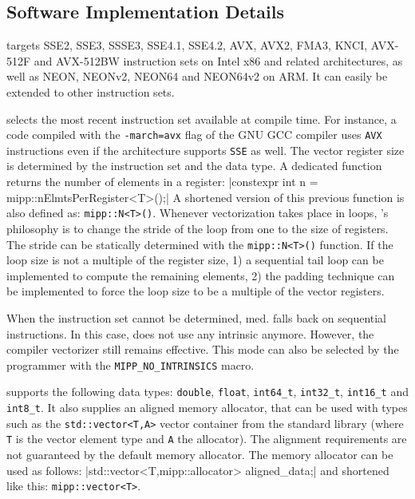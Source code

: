 \subsection{Software Implementation Details}
\label{sec:opt_mipp_implem}

\MIPP targets SSE2, SSE3, SSSE3, SSE4.1, SSE4.2, AVX, AVX2, FMA3, KNCI, AVX-512F
and AVX-512BW instruction sets on Intel x86 and related architectures, as well
as NEON, NEONv2, NEON64 and NEON64v2 on ARM\R. It can easily be extended to
other instruction sets.

\MIPP selects the most recent instruction set available at compile time. For
instance, a code compiled with the \verb|-march=avx| flag of the GNU GCC
compiler uses \verb|AVX| instructions even if the architecture supports
\verb|SSE| as well. The vector register size is determined by the instruction
set and the data type. A dedicated function returns the number of elements in a
\MIPP register:
|constexpr int n = mipp::nElmtsPerRegister<T>();|
{\noindent
A shortened version of this previous function is also defined as:
\verb|mipp::N<T>()|. Whenever vectorization takes place in loops, \MIPP's
philosophy is to change the stride of the loop from one to the size of
registers. The stride can be statically determined with the \verb|mipp::N<T>()|
function. If the loop size is not a multiple of the register size, 1) a
sequential tail loop can be implemented to compute the remaining elements, 2)
the padding technique can be implemented to force the loop size to be a multiple
of the vector registers.
}

When the instruction set cannot be determined, \MIPP med. falls back on
sequential instructions. In this case, \MIPP does not use any intrinsic anymore.
However, the compiler vectorizer still remains effective. This mode can also be
selected by the programmer with the \verb|MIPP_NO_INTRINSICS| macro.

\MIPP supports the following data types: \verb|double|, \verb|float|,
\verb|int64_t|, \verb|int32_t|, \verb|int16_t| and \verb|int8_t|. It also
supplies an aligned memory allocator, that can be used with types such as the
\verb|std::vector<T,A>| vector container from the \Cxx standard library (where
\verb|T| is the vector element type and \verb|A| the allocator). The alignment
requirements are not guaranteed by the default \Cxx memory allocator. The \MIPP
memory allocator can be used as follows:
|std::vector<T,mipp::allocator> aligned_data;|
{\noindent
and shortened like this: \verb|mipp::vector<T>|.
}

